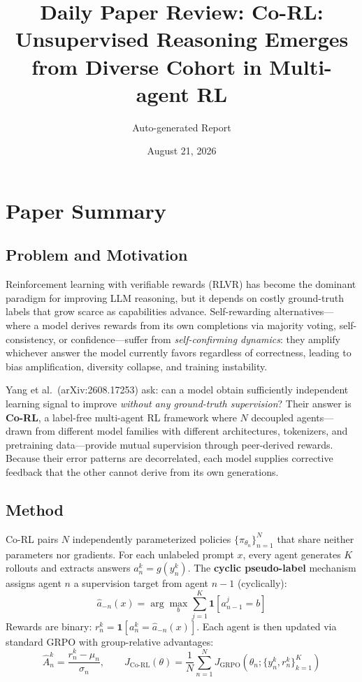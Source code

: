 \documentclass[11pt,a4paper]{article}
\title{Daily Paper Review: Co-RL: Unsupervised Reasoning Emerges from Diverse Cohort in Multi-agent RL}
\author{Auto-generated Report}
\date{August 21, 2026}
\begin{document}
\maketitle

\section{Paper Summary}

\subsection{Problem and Motivation}
Reinforcement learning with verifiable rewards (RLVR) has become the dominant paradigm for improving LLM reasoning, but it depends on costly ground-truth labels that grow scarce as capabilities advance. Self-rewarding alternatives---where a model derives rewards from its own completions via majority voting, self-consistency, or confidence---suffer from \emph{self-confirming dynamics}: they amplify whichever answer the model currently favors regardless of correctness, leading to bias amplification, diversity collapse, and training instability.

Yang et al.\ (arXiv:2608.17253) ask: can a model obtain sufficiently independent learning signal to improve \emph{without any ground-truth supervision}? Their answer is \textbf{Co-RL}, a label-free multi-agent RL framework where $N$ decoupled agents---drawn from different model families with different architectures, tokenizers, and pretraining data---provide mutual supervision through peer-derived rewards. Because their error patterns are decorrelated, each model supplies corrective feedback that the other cannot derive from its own generations.

\subsection{Method}
Co-RL pairs $N$ independently parameterized policies $\{\pi_{\theta_n}\}_{n=1}^N$ that share neither parameters nor gradients. For each unlabeled prompt $x$, every agent generates $K$ rollouts and extracts answers $a_n^k = g(y_n^k)$. The \textbf{cyclic pseudo-label} mechanism assigns agent $n$ a supervision target from agent $n{-}1$ (cyclically):
\begin{equation}
\hat{a}_{-n}(x) = \arg\max_b \sum_{j=1}^K \mathbf{1}[a_{n-1}^j = b]
\end{equation}
Rewards are binary: $r_n^k = \mathbf{1}[a_n^k = \hat{a}_{-n}(x)]$. Each agent is then updated via standard GRPO with group-relative advantages:
\begin{equation}
\hat{A}_n^k = \frac{r_n^k - \mu_n}{\sigma_n}, \qquad J_{\text{Co-RL}}(\theta) = \frac{1}{N}\sum_{n=1}^N J_{\text{GRPO}}(\theta_n; \{y_n^k, r_n^k\}_{k=1}^K)
\end{equation}
\end{document}

